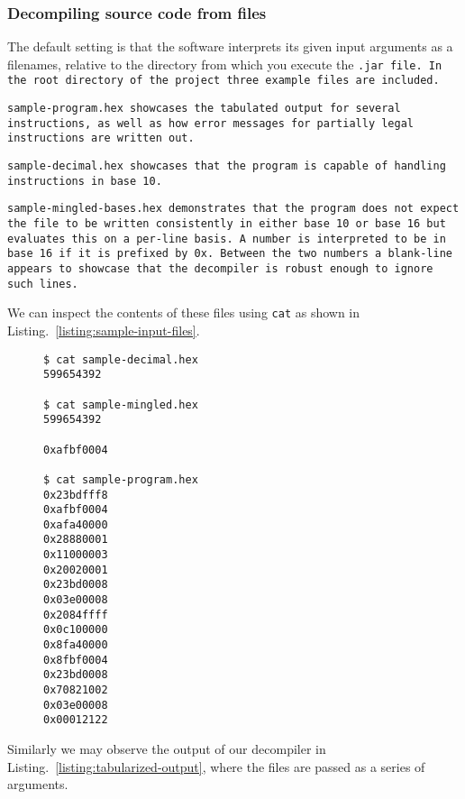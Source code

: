 \subsubsection{Decompiling source code from files}

The default setting is that the software interprets its given input
arguments as a filenames, relative to the directory from which you
execute the \tt{.jar} file. In the root directory of the project three
example files are included.

\tt{sample-program.hex} showcases the tabulated output for several
instructions, as well as how error messages for partially legal
instructions are written out.

\tt{sample-decimal.hex} showcases that the program is capable
of handling instructions in base 10. 

\tt{sample-mingled-bases.hex} demonstrates that the program does not
expect the file to be written consistently in either base 10 or base
16 but evaluates this on a per-line basis. A number is interpreted to
be in base 16 if it is prefixed by \tt{0x}. Between the two numbers
a blank-line appears to showcase that the decompiler is robust
enough to ignore such lines.

We can inspect the contents of these files using \texttt{cat}
as shown in Listing.~\ref{listing:sample-input-files}.

\begin{figure}
\begin{lstlisting}[style=plain,
    caption=Sample input files,
    label=listing:sample-input-files]
$ cat sample-decimal.hex 
599654392

$ cat sample-mingled.hex
599654392

0xafbf0004

$ cat sample-program.hex
0x23bdfff8
0xafbf0004
0xafa40000
0x28880001
0x11000003
0x20020001
0x23bd0008
0x03e00008
0x2084ffff
0x0c100000
0x8fa40000
0x8fbf0004
0x23bd0008
0x70821002
0x03e00008
0x00012122
\end{lstlisting}
\end{figure}

Similarly we may observe the output of our decompiler in
Listing.~\ref{listing:tabularized-output}, where the
files are passed as a series of arguments.

